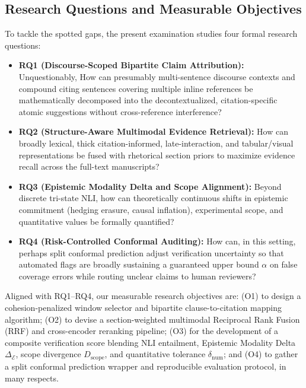 \documentclass[sigconf]{acmart}
\begin{document}
\subsection{Research Questions and Measurable Objectives}
To tackle the spotted gaps, the present examination studies four formal research questions:
\begin{itemize}
\item \textbf{RQ1 (Discourse-Scoped Bipartite Claim Attribution):} Unquestionably, How can presumably multi-sentence discourse contexts and compound citing sentences covering multiple inline references be mathematically decomposed into the decontextualized, citation-specific atomic suggestions without cross-reference interference?
\item \textbf{RQ2 (Structure-Aware Multimodal Evidence Retrieval):} How can broadly lexical, thick citation-informed, late-interaction, and tabular/visual representations be fused with rhetorical section priors to maximize evidence recall across the full-text manuscripts?
\item \textbf{RQ3 (Epistemic Modality Delta and Scope Alignment):} Beyond discrete tri-state NLI, how can theoretically continuous shifts in epistemic commitment (hedging erasure, causal inflation), experimental scope, and quantitative values be formally quantified?
\item \textbf{RQ4 (Risk-Controlled Conformal Auditing):} How can, in this setting, perhaps split conformal prediction adjust verification uncertainty so that automated flags are broadly sustaining a guaranteed upper bound $\alpha$ on false coverage errors while routing unclear claims to human reviewers?
\end{itemize}

Aligned with RQ1--RQ4, our measurable research objectives are: (O1) to design a cohesion-penalized window selector and bipartite clause-to-citation mapping algorithm; (O2) to devise a section-weighted multimodal Reciprocal Rank Fusion (RRF) and cross-encoder reranking pipeline; (O3) for the development of a composite verification score blending NLI entailment, Epistemic Modality Delta $\Delta_{\mathcal{E}}$, scope divergence $D_{\text{scope}}$, and quantitative tolerance $\delta_{\text{num}}$; and (O4) to gather a split conformal prediction wrapper and reproducible evaluation protocol, in many respects.
\end{document}
